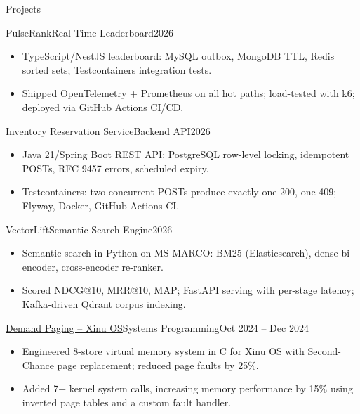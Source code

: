 \documentclass[]{mcdowellcv}
\begin{document}
\begin{cvsection}{Projects}
  \begin{cvsubsection}{PulseRank}{Real-Time Leaderboard}{2026}
    \begin{itemize}
      \item TypeScript/NestJS leaderboard: MySQL outbox, MongoDB TTL, Redis sorted sets; Testcontainers integration tests.
      \item Shipped OpenTelemetry + Prometheus on all hot paths; load-tested with k6; deployed via GitHub Actions CI/CD.
    \end{itemize}
    \vspace{-1.5pt}
  \end{cvsubsection}

  \begin{cvsubsection}{Inventory Reservation Service}{Backend API}{2026}
    \begin{itemize}
      \item Java 21/Spring Boot REST API: PostgreSQL row-level locking, idempotent POSTs, RFC 9457 errors, scheduled expiry.
      \item Testcontainers: two concurrent POSTs produce exactly one 200, one 409; Flyway, Docker, GitHub Actions CI.
    \end{itemize}
    \vspace{-1.5pt}
  \end{cvsubsection}

  \begin{cvsubsection}{VectorLift}{Semantic Search Engine}{2026}
    \begin{itemize}
      \item Semantic search in Python on MS MARCO: BM25 (Elasticsearch), dense bi-encoder, cross-encoder re-ranker.
      \item Scored NDCG@10, MRR@10, MAP; FastAPI serving with per-stage latency; Kafka-driven Qdrant corpus indexing.
    \end{itemize}
    \vspace{-1.5pt}
  \end{cvsubsection}

  \begin{cvsubsection}{\href{https://github.com/ncsu-csc-501/project3-mndedhia_akulka26_aapai}{Demand Paging -- Xinu OS}}{Systems Programming}{Oct 2024 -- Dec 2024}
    \begin{itemize}
      \item Engineered 8-store virtual memory system in C for Xinu OS with Second-Chance page replacement; reduced page faults by 25\%.
      \item Added 7+ kernel system calls, increasing memory performance by 15\% using inverted page tables and a custom fault handler.
    \end{itemize}
  \end{cvsubsection}
\end{cvsection}
\end{document}
